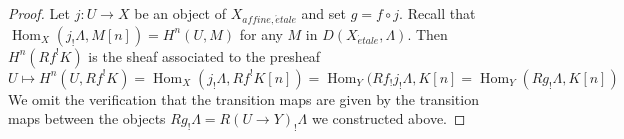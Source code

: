 \documentclass{stacks-project}
\theoremstyle{plain}
\theoremstyle{definition}
\theoremstyle{remark}
\numberwithin{equation}{subsection}
\def\Hom{\mathop{\mathrm{Hom}}\nolimits}
\def\etale{{\acute{e}tale}}
\begin{document}
\begin{proof}
Let $j : U \to X$ be an object of $X_{affine, \etale}$ and set $g = f \circ j$.
Recall that $\Hom_X(j_!\Lambda, M[n]) = H^n(U, M)$ for any $M$ in
$D(X_\etale, \Lambda)$. Then $H^n(Rf^!K)$ is the sheaf associated to the
presheaf
$$
U \mapsto H^n(U, Rf^!K) = \Hom_X(j_!\Lambda, Rf^!K[n]) =
\Hom_Y(Rf_!j_!\Lambda, K[n] = \Hom_Y(Rg_!\Lambda, K[n])
$$
We omit the verification that the transition maps are given by the transition
maps between the objects $Rg_!\Lambda = R(U \to Y)_!\Lambda$ we constructed
above.
\end{proof}




















\end{document}
